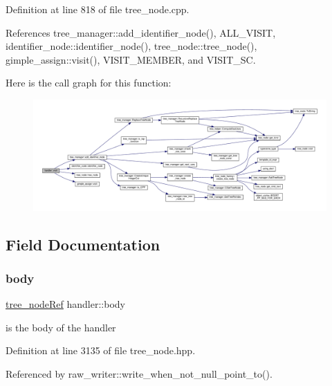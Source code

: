 Definition at line 818 of file tree\+\_\+node.\+cpp.



References tree\+\_\+manager\+::add\+\_\+identifier\+\_\+node(), A\+L\+L\+\_\+\+V\+I\+S\+IT, identifier\+\_\+node\+::identifier\+\_\+node(), tree\+\_\+node\+::tree\+\_\+node(), gimple\+\_\+assign\+::visit(), V\+I\+S\+I\+T\+\_\+\+M\+E\+M\+B\+ER, and V\+I\+S\+I\+T\+\_\+\+SC.

Here is the call graph for this function\+:
\nopagebreak
\begin{figure}[H]
\begin{center}
\leavevmode
\includegraphics[width=350pt]{d4/dd4/structhandler_a59a457d67ccce8a01c0025929abba5a1_cgraph}
\end{center}
\end{figure}


\subsection{Field Documentation}
\mbox{\label{structhandler_a00ed2efee98a03945bea7528b70b9160}} 
\subsubsection{\texorpdfstring{body}{body}}
{\footnotesize\ttfamily \hyperlink{tree__node_8hpp_a6ee377554d1c4871ad66a337eaa67fd5}{tree\+\_\+node\+Ref} handler\+::body}



is the body of the handler 



Definition at line 3135 of file tree\+\_\+node.\+hpp.



Referenced by raw\+\_\+writer\+::write\+\_\+when\+\_\+not\+\_\+null\+\_\+point\+\_\+to().

\mbox{\label{structhandler_aac4431e50650691272924915662146c3}} 
